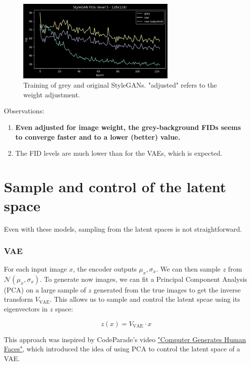 \documentclass{article}
\begin{document}
\begin{figure}[H]
    \centering
    \includegraphics[width=0.7\textwidth]{images/stylegan_fids.png}
    \caption{Training of grey and original StyleGANs. "adjusted" refers to the weight adjustment.}
\end{figure}

Observations:
\begin{enumerate}
  \item \textbf{Even adjusted for image weight, the grey-background FIDs seems to converge faster and to a lower (better) value.}
  \item The FID levels are much lower than for the VAEs, which is expected.
\end{enumerate}

\section{Sample and control of the latent space}

Even with these models, sampling from the latent spaces is not straightforward.

\subsubsection*{VAE}

For each input image $x$, the encoder outputs $\mu_x, \sigma_x$. We can then sample $z$ from $\mathcal{N}(\mu_x, \sigma_x)$.
To generate now images, we can fit a Principal Component Analysis (PCA) on a large sample of $z$ generated from the true images to get the inverse transform $V_{\text{VAE}}$.
This allows us to sample and control the latent spcae using its eigenvectors in $z$ space:

\[z(x) = V_{\text{VAE}} \cdot x\]

This approach was inspired by CodeParade's video \href{https://www.youtube.com/watch?v=4VAkrUNLKSo}{"Computer Generates Human Faces"}, which introduced the idea of using PCA to control the latent space of a VAE.
\end{document}
